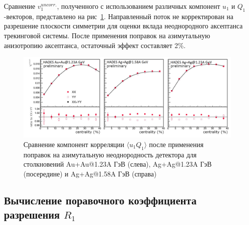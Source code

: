 Сравнение $v_1^{uncorr.}$, полученного с использованием различных компонент $u_1$ и $Q_1$-векторов, представлено на рис~\ref{fig:hades_uq_corr}. 
Направленный поток не корректирован на разрешение плоскости симметрии для оценки вклада неоднородного аксептанса трекинговой системы. 
После применения поправок на азимутальную анизотропию аксептанса, остаточный эффект составляет 2\%.
%
\begin{figure}[ht]
\begin{center}
\includegraphics[width=0.75\linewidth]{images/hades_u1W1_centrality.png}
\caption{Сравнение компонент корреляции $\langle u_1 Q_1 \rangle$ после применения поправок на азимутальную неоднородность детектора для столкновений Au+Au@1.23A ГэВ (слева), Ag+Ag@1.23A ГэВ (посередине) и Ag+Ag@1.58A ГэВ (справа)}
\label{fig:hades_uq_corr}
\end{center}
\end{figure}
%

\subsection{Вычисление поравочного коэффициента разрешения $R_1$}

